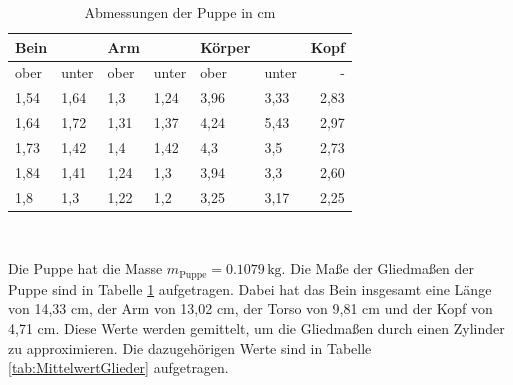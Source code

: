 \begin{table}
  \centering
  \caption{Abmessungen der Puppe in cm}
  \label{tab:Abmessungen}
  \begin{tabular}{llllllr}
    \toprule
    Bein &  & Arm &  & Körper &  &  Kopf\\
    \midrule
               ober &      unter &           ober &      unter & ober &      unter &             - \\
               1,54 &       1,64 &            1,3 &       1,24 & 3,96 &       3,33 &            2,83 \\
               1,64 &       1,72 &           1,31 &       1,37 & 4,24 &       5,43 &            2,97 \\
               1,73 &       1,42 &            1,4 &       1,42 &  4,3 &        3,5 &            2,73 \\
               1,84 &       1,41 &           1,24 &        1,3 & 3,94 &        3,3 &            2,60 \\
                1,8 &        1,3 &           1,22 &        1,2 & 3,25 &       3,17 &            2,25 \\
    \bottomrule
    \end{tabular}\\

\end{table}

Die Puppe hat die Masse $m_{\text{Puppe}} = 0.1079 \, \unit{\kilo\gram}$.
Die Maße der Gliedmaßen der Puppe sind in Tabelle \ref{tab:Abmessungen} aufgetragen.
Dabei hat das Bein insgesamt eine Länge von 14,33 cm, der Arm von 13,02 cm, der Torso von 9,81 cm und der Kopf von 4,71 cm.
Diese Werte werden gemittelt, um die Gliedmaßen durch einen Zylinder zu approximieren.
Die dazugehörigen Werte sind in Tabelle \ref{tab:MittelwertGlieder} aufgetragen.

